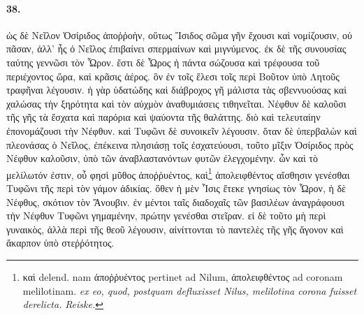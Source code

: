 \documentclass[a4paper, 11pt, oneside, polutonikogreek, german]{article}
\begin{document}
\paragraph{38.}
ὡς δὲ Νεῖλον Ὀσίριδος ἀποῤῥοὴν, οὕτως Ἴσιδος σῶμα γῆν ἔχουσι καὶ νομίζουσιν, οὐ πᾶσαν, ἀλλ' ἧς ὁ Νεῖλος ἐπιβαίνει σπερμαίνων καὶ μιγνύμενος. ἐκ δὲ τῆς συνουσίας ταύτης γεννῶσι τὸν Ὧρον. ἔστι δὲ Ὧρος ἡ πάντα σώζουσα καὶ τρέφουσα τοῦ περιέχοντος ὥρα, καὶ κρᾶσις ἀέρος. ὃν ἐν τοῖς ἕλεσι τοῖς περὶ Βοῦτον ὑπὸ Λητοῦς τραφῆναι λέγουσιν. ἡ γὰρ ὑδατώδης καὶ διάβροχος γῆ μάλιστα τὰς σβεννυούσας καὶ χαλώσας τὴν ξηρότητα καὶ τὸν αὐχμὸν ἀναθυμιάσεις τιθηνεῖται. Νέφθυν δὲ καλοῦσι τῆς γῆς τὰ ἔσχατα καὶ παρόρια καὶ ψαύοντα τῆς θαλάττης. διὸ καὶ τελευταίην ἐπονομάζουσι τὴν Νέφθυν. καὶ Τυφῶνι δὲ συνοικεῖν λέγουσιν. ὅταν δὲ ὑπερβαλὼν καὶ πλεονάσας ὁ Νεῖλος, ἐπέκεινα πλησιάσῃ τοῖς ἐσχατεύουσι, τοῦτο μῖξιν Ὀσίριδος πρὸς Νέφθυν καλοῦσιν, ὑπὸ τῶν ἀναβλαστανόντων φυτῶν ἐλεγχομένην. ὧν καὶ τὸ μελίλωτόν ἐστιν, οὗ φησὶ μῦθος ἀποῤῥυέντος, καὶ\footnote{καὶ delend. nam ἀποῤῥυέντος pertinet ad Nilum, ἀπολειφθέντος ad coronam melilotinam. \emph{ex eo, quod, postquam defluxisset Nilus, melilotina corona fuisset derelicta.} \emph{Reiske.}} ἀπολειφθέντος αἴσθησιν γενέσθαι Τυφῶνι τῆς περὶ τὸν γάμον ἀδικίας. ὅθεν ἡ μὲν Ἶσις ἔτεκε γνησίως τὸν Ὧρον, ἡ δὲ Νέφθυς, σκότιον τὸν Ἄνουβιν. ἐν μέντοι ταῖς διαδοχαῖς τῶν βασιλέων ἀναγράφουσι τὴν Νέφθυν Τυφῶνι γημαμένην, πρώτην γενέσθαι στεῖραν. εἰ δὲ τοῦτο μὴ περὶ γυναικὸς, ἀλλὰ περὶ τῆς θεοῦ λέγουσιν, αἰνίττονται τὸ παντελὲς τῆς γῆς ἄγονον καὶ ἄκαρπον ὑπὸ στεῤῥότητος.
\end{document}
